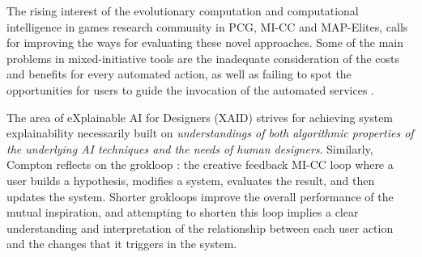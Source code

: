 The rising interest of the evolutionary computation and computational intelligence in games research community in PCG, MI-CC and MAP-Elites, %
calls for improving the ways for evaluating these novel approaches. Some of the main problems in mixed-initiative tools are the inadequate consideration of the costs and benefits for every automated action, as well as failing to spot the opportunities for users to guide the invocation of the automated services \cite{p9Horvitz99-mixedInit}. 

The area of eXplainable AI for Designers (XAID) \cite{p9Zhu2018-XAIDesignersMICC} strives for achieving system explainability necessarily built on \textit{understandings of both algorithmic properties of the underlying AI techniques and the needs of human designers}. Similarly, Compton reflects on the grokloop \cite{p9ComptonPhD}: the creative feedback MI-CC loop where a user builds a hypothesis, modifies a system, evaluates the result, and then updates the system. Shorter grokloops improve the overall performance of the mutual inspiration, and attempting to shorten this loop implies a clear understanding and interpretation of the relationship between each user action and the changes that it triggers in the system.

